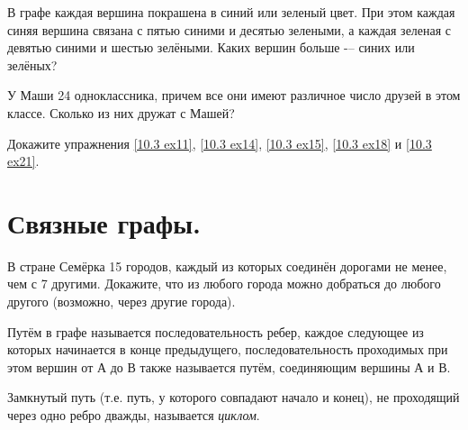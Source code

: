 \begin{ex}
    В графе каждая вершина покрашена в синий или зеленый цвет. При этом каждая синяя вершина связана с пятью синими и десятью зелеными, а каждая зеленая с девятью синими и шестью зелёными. Каких вершин больше -– синих или зелёных?
\end{ex}

\begin{ex} \label{10.3 ex21}
    У Маши 24 одноклассника, причем все они имеют различное число друзей в этом классе. Сколько из них дружат с Машей?
\end{ex}

\begin{thm}
    Докажите упражнения \ref{10.3 ex11}, \ref{10.3 ex14}, \ref{10.3 ex15}, \ref{10.3 ex18} и \ref{10.3 ex21}.
\end{thm}

\newpage

\section{Связные графы.}

\begin{ex} \label{10.3 ex22}
    В стране Семёрка 15 городов, каждый из которых соединён дорогами не менее, чем с 7 другими. Докажите, что из любого города можно добраться до любого другого (возможно, через другие города).
\end{ex}

\begin{dfn}
    Путём в графе называется последовательность ребер, каждое следующее из которых начинается в конце предыдущего, последовательность проходимых при этом вершин от А до В также называется путём, соединяющим вершины А и В.\footnotemark
\end{dfn}

\begin{dfn}
    Замкнутый путь (т.е. путь, у которого совпадают начало и конец), не проходящий через одно ребро дважды, называется \textit{циклом}.\footnotemark
\end{dfn}

